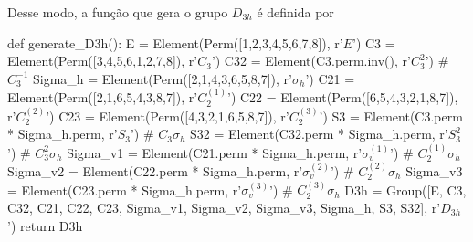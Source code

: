 \documentclass[a4paper,10pt]{article}
\begin{document}
Desse modo, a função que gera o grupo $D_{3h}$ é definida por
\begin{Python}
def generate_D3h():
    E = Element(Perm([1,2,3,4,5,6,7,8]), r'$E$')
    C3 = Element(Perm([3,4,5,6,1,2,7,8]), r'$C_3$')
    C32 = Element(C3.perm.inv(), r'$C_3^2$')                            # $C_3^{-1}$
    Sigma_h = Element(Perm([2,1,4,3,6,5,8,7]), r'$\sigma_h$')
    C21 = Element(Perm([2,1,6,5,4,3,8,7]), r'$C_2^{(1)}$')
    C22 = Element(Perm([6,5,4,3,2,1,8,7]), r'$C_2^{(2)}$')
    C23 = Element(Perm([4,3,2,1,6,5,8,7]), r'$C_2^{(3)}$')
    S3 = Element(C3.perm * Sigma_h.perm, r'$S_3$')                      # $C_3 \sigma_h$
    S32 = Element(C32.perm * Sigma_h.perm, r'$S_3^2$')                  # $C_3^2 \sigma_h$
    Sigma_v1 = Element(C21.perm * Sigma_h.perm, r'$\sigma_v^{(1)}$')    # $C_2^{(1)} \sigma_h$
    Sigma_v2 = Element(C22.perm * Sigma_h.perm, r'$\sigma_v^{(2)}$')    # $C_2^{(2)} \sigma_h$
    Sigma_v3 = Element(C23.perm * Sigma_h.perm, r'$\sigma_v^{(3)}$')    # $C_2^{(3)} \sigma_h$
    D3h = Group([E, C3, C32, C21, C22, C23, Sigma_v1,
                 Sigma_v2, Sigma_v3, Sigma_h, S3, S32], r'$D_{3h}$')
    return D3h
\end{Python}

\n
\end{document}
